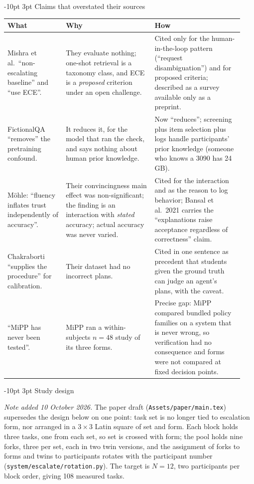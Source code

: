 \documentclass[9pt,letterpaper]{extarticle}
\makeatletter
\newcommand{\rowsep}{\noalign{\vskip 1.5pt}\arrayrulecolor{black!35}\hline\arrayrulecolor{black}\noalign{\vskip 1.5pt}}
\renewcommand\section{\@startsection{section}{1}{\z@}%
  {-10pt \@plus -2pt \@minus -1pt}{3pt}%
  {\sffamily\bfseries\large\color{accent}}}
\let\oldsection\section
\renewcommand{\section}{\needspace{7\baselineskip}\oldsection}
\newcommand{\wwh}{\toprule
\sffamily\bfseries\color{accent} What & \sffamily\bfseries\color{accent} Why & \sffamily\bfseries\color{accent} How \\
\midrule}
\newenvironment{wwhtable}{\footnotesize
\begin{longtable}{@{}>{\raggedright\arraybackslash}p{0.23\linewidth}>{\raggedright\arraybackslash}p{0.355\linewidth}>{\raggedright\arraybackslash}p{0.355\linewidth}@{}}
\wwh}{\bottomrule\end{longtable}}
\makeatother
\begin{document}
\section{Claims that overstated their sources}
\begin{wwhtable}
Mishra et al.\ ``non-escalating baseline'' and ``use ECE''. &
They evaluate nothing; one-shot retrieval is a taxonomy class, and ECE is a
\emph{proposed} criterion under an open challenge. &
Cited only for the human-in-the-loop pattern (``request disambiguation'') and
for proposed criteria; described as a survey available only as a preprint. \\
\rowsep
FictionalQA ``removes'' the pretraining confound. &
It reduces it, for the model that ran the check, and says nothing about
human prior knowledge. &
Now ``reduces''; screening plus item selection plus logs handle participants'
prior knowledge (someone who knows a 3090 has 24\,GB). \\
\rowsep
M\"ohle: ``fluency inflates trust independently of accuracy''. &
Their convincingness main effect was non-significant; the finding is an
interaction with \emph{stated} accuracy; actual accuracy was never varied. &
Cited for the interaction and as the reason to log behavior; Bansal et al.\
2021 carries the ``explanations raise acceptance regardless of correctness''
claim. \\
\rowsep
Chakraborti ``supplies the procedure'' for calibration. &
Their dataset had no incorrect plans. &
Cited in one sentence as precedent that students given the ground truth can
judge an agent's plans, with the caveat. \\
\rowsep
``MiPP has never been tested''. &
MiPP ran a within-subjects $n{=}48$ study of its three forms. &
Precise gap: MiPP compared bundled policy families on a system that is never
wrong, so verification had no consequence and forms were not compared at fixed
decision points. \\
\end{wwhtable}

\section{Study design}

\textit{Note added 10 October 2026.} The paper draft (\texttt{Assets/paper/main.tex}) supersedes the design below on one point: task set is no longer tied to escalation form, nor arranged in a $3\times3$ Latin square of set and form. Each block holds three tasks, one from each set, so set is crossed with form; the pool holds nine forks, three per set, each in two twin versions, and the assignment of forks to forms and twins to participants rotates with the participant number (\texttt{system/escalate/rotation.py}). The target is $N=12$, two participants per block order, giving 108 measured tasks.
\end{document}
